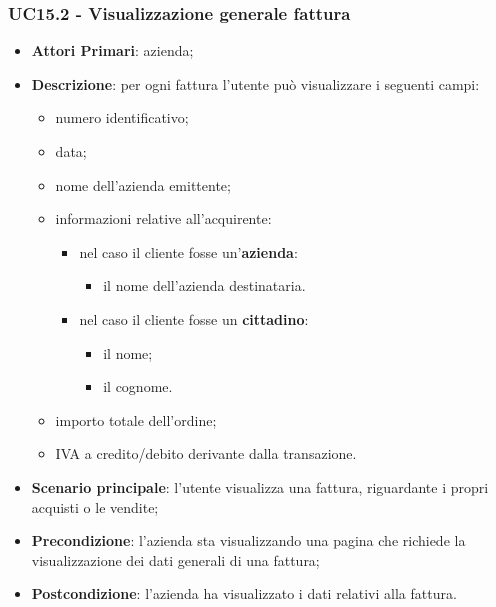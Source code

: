 \subsubsection{UC15.2 - Visualizzazione generale fattura}
\begin{itemize}
	\item \textbf{Attori Primari}: azienda;
	\item \textbf{Descrizione}: per ogni fattura l'utente può visualizzare i seguenti campi:
	\begin{itemize}
		\item numero identificativo;
		\item data;
		\item nome dell'azienda emittente;
		\item informazioni relative all'acquirente:
		\begin{itemize}
			\item nel caso il cliente fosse un'\textbf{azienda}:
			\begin{itemize}
				\item il nome dell'azienda destinataria.
			\end{itemize}
			\item nel caso il cliente fosse un \textbf{cittadino}:
			\begin{itemize}
				\item il nome;
				\item il cognome.
			\end{itemize}
		\end{itemize}
		\item importo totale dell'ordine;
		\item IVA a credito/debito derivante dalla transazione.
	\end{itemize}
	\item \textbf{Scenario principale}: l'utente visualizza una fattura, riguardante i propri  acquisti o le vendite;
	\item \textbf{Precondizione}: l'azienda sta visualizzando una pagina che richiede la visualizzazione dei dati generali di una fattura;
	\item \textbf{Postcondizione}: l'azienda ha visualizzato i dati relativi alla fattura.
\end{itemize}


